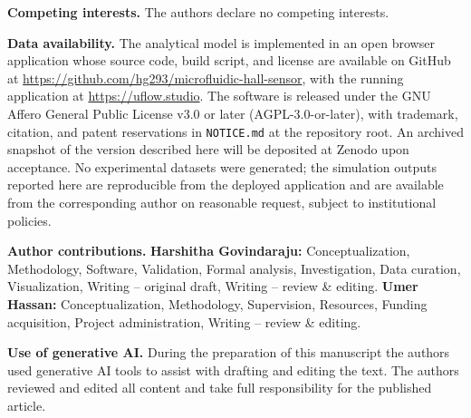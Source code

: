 \documentclass[pdflatex,sn-basic]{sn-jnl}
\theoremstyle{thmstyleone}
\theoremstyle{thmstyletwo}
\theoremstyle{thmstylethree}
\begin{document}
\textbf{Competing interests.} The authors declare no competing interests.

\textbf{Data availability.} The analytical model is implemented in an open browser application whose source code, build script, and license are available on GitHub at \url{https://github.com/hg293/microfluidic-hall-sensor}, with the running application at \url{https://uflow.studio}. The software is released under the GNU Affero General Public License v3.0 or later (AGPL-3.0-or-later), with trademark, citation, and patent reservations in \texttt{NOTICE.md} at the repository root. An archived snapshot of the version described here will be deposited at Zenodo upon acceptance. No experimental datasets were generated; the simulation outputs reported here are reproducible from the deployed application and are available from the corresponding author on reasonable request, subject to institutional policies.

\textbf{Author contributions.} \textbf{Harshitha Govindaraju:} Conceptualization, Methodology, Software, Validation, Formal analysis, Investigation, Data curation, Visualization, Writing -- original draft, Writing -- review \& editing. \textbf{Umer Hassan:} Conceptualization, Methodology, Supervision, Resources, Funding acquisition, Project administration, Writing -- review \& editing.

\textbf{Use of generative AI.} %
During the preparation of this manuscript the authors used generative AI tools to assist with drafting and editing the text. The authors reviewed and edited all content and take full responsibility for the published article.


\end{document}
